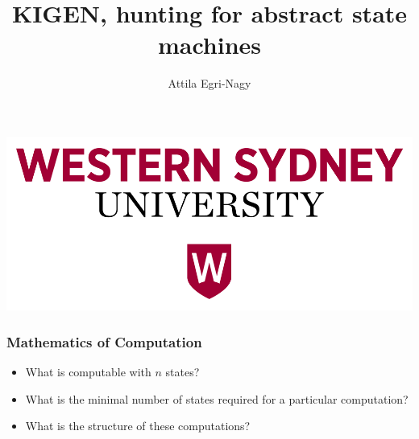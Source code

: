 \documentclass{beamer}
\begin{document}
\title[MathComp]{\textbf{KIGEN, hunting for abstract state machines}}
\author[e-n@]{Attila Egri-Nagy}
\date{}


\begin{frame}
\titlepage
\begin{center}
\includegraphics[width=.5\textwidth]{wsu}
\end{center}
\end{frame}




\begin{frame}\frametitle{Mathematics of Computation}
\begin{itemize}
\item What is computable with $n$ states?
\item What is the minimal number of states required for a particular
  computation?
\item What is the structure of these computations?
\end{itemize}
\end{frame}
\end{document}
